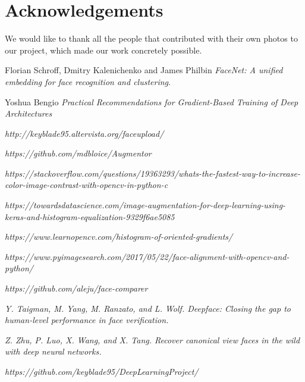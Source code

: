 \documentclass[10pt,twocolumn,letterpaper]{article}
\begin{document}










\section*{Acknowledgements}
We would like to thank all the people that contributed with their own photos to our project, which made our work concretely possible.

\begin{thebibliography}{9}

Florian Schroff, Dmitry Kalenichenko and James Philbin
\textit{FaceNet: A unified embedding for face recognition and clustering}.

Yoshua Bengio
\textit{Practical Recommendations for Gradient-Based Training of Deep
Architectures}

\textit{http://keyblade95.altervista.org/faceupload/}

\textit{https://github.com/mdbloice/Augmentor}

\textit{https://stackoverflow.com/questions/19363293/whats-the-fastest-way-to-increase-color-image-contrast-with-opencv-in-python-c}

\textit{https://towardsdatascience.com/image-augmentation-for-deep-learning-using-keras-and-histogram-equalization-9329f6ae5085}

\textit{https://www.learnopencv.com/histogram-of-oriented-gradients/}

\textit{https://www.pyimagesearch.com/2017/05/22/face-alignment-with-opencv-and-python/}

\textit{https://github.com/aleju/face-comparer}

\textit{Y. Taigman, M. Yang, M. Ranzato, and L. Wolf. Deepface:
Closing the gap to human-level performance in face verification.}

\textit{Z. Zhu, P. Luo, X. Wang, and X. Tang. Recover canonical view
faces in the wild with deep neural networks.}

\textit{https://github.com/keyblade95/DeepLearningProject/}

\end{thebibliography}
\end{document}
